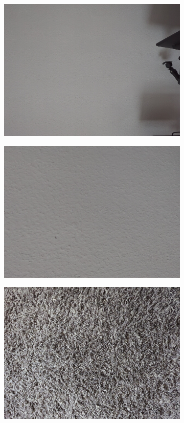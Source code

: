 \begin{figure}[h!tb]
    \centering
    \begin{subfigure}[b]{0.25\textwidth}
        \centering
        \includegraphics[width=0.9\linewidth]{images/materials/wall-far-cam}
    \end{subfigure}%
    \begin{subfigure}[b]{0.25\textwidth}
        \centering
        \includegraphics[width=0.9\linewidth]{images/materials/wall-close-cam}
    \end{subfigure}%
    \begin{subfigure}[b]{0.25\textwidth}
        \centering
        \includegraphics[width=0.9\linewidth]{images/materials/carpet-cam}

\end{subfigure}
\end{figure}
